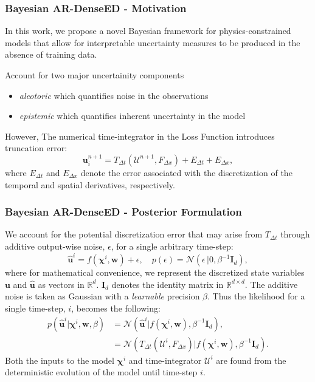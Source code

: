 \documentclass{beamer}
\theoremstyle{remark}
\begin{document}
\begin{frame}
\frametitle{Bayesian AR-DenseED - Motivation}
In this work, we propose a novel Bayesian framework for physics-constrained models that allow for interpretable uncertainty measures to be produced in the absence of training data.

Account for two major uncertainity components

\begin{itemize}
\item{\textit{aleotoric} which quantifies noise in the observations}
\item{\textit{epistemic} which quantifies inherent uncertainty in the model}
\end{itemize}

However, The numerical time-integrator in the Loss Function introduces truncation error:
\begin{equation}
    \bm{u}_{i}^{n+1} = T_{\Delta t}\left(\bm{\mathcal{U}}^{n+1}, F_{\Delta x}\right) + E_{\Delta t} + E_{\Delta x},
\end{equation}
where $E_{\Delta t}$ and $E_{\Delta x}$ denote the error associated with the discretization of the temporal and spatial derivatives, respectively.

\end{frame}

\begin{frame}
\frametitle{Bayesian AR-DenseED - Posterior Formulation}
We account for the potential discretization error that may arise from $T_{\Delta t}$ through additive output-wise noise, $\epsilon$, for a single arbitrary time-step:
\begin{equation}
    \hat{\bm{u}}^{i} = f\left(\bm{\chi}^{i},\textbf{w}\right) + \epsilon, \quad p\left(\epsilon\right)= \mathcal{N}\left(\epsilon\,|0,\beta^{-1}\bm{I}_{d}\right),
\end{equation}
where for mathematical convenience, we represent the discretized state variables $\bm{u}$ and $\hat{\bm{u}}$ as vectors in $\mathbb{R}^{d}$.
$\bm{I}_{d}$ denotes the identity matrix in $\mathbb{R}^{d\times d}$.
The additive noise is taken as Gaussian with a \textit{learnable} precision $\beta$.
Thus the likelihood for a single time-step, $i$, becomes the following:
\begin{align}
   p\left(\hat{\bm{u}}^{i}|\bm{\chi}^{i},\textbf{w}, \beta\right)&=\mathcal{N}\left(\hat{\bm{u}}^{i}|f\left(\bm{\chi}^{i},\textbf{w}\right), \beta^{-1}\bm{I}_{d}\right), \nonumber\\
   &=\mathcal{N}\left(T_{\Delta t}\left(\bm{\mathcal{U}}^{i}, F_{\Delta x}\right)|f\left(\bm{\chi}^{i},\textbf{w}\right), \beta^{-1}\bm{I}_{d}\right).
\end{align}
Both the inputs to the model $\bm{\chi}^{i}$  and time-integrator $\bm{\mathcal{U}}^{i}$ are found from the deterministic evolution of the model until time-step $i$.
\end{frame}
\end{document}
